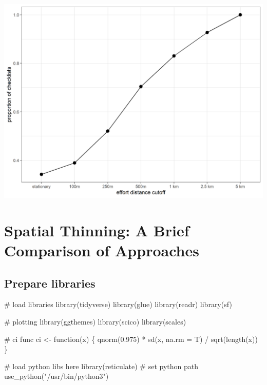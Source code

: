 \documentclass[]{article}
\newenvironment{Shaded}{}{}
\newcommand{\CommentTok}[1]{\textcolor[rgb]{0.00,0.50,0.00}{#1}}
\newcommand{\ControlFlowTok}[1]{\textcolor[rgb]{0.00,0.00,1.00}{#1}}
\newcommand{\DataTypeTok}[1]{#1}
\newcommand{\FloatTok}[1]{#1}
\newcommand{\KeywordTok}[1]{\textcolor[rgb]{0.00,0.00,1.00}{#1}}
\newcommand{\NormalTok}[1]{#1}
\newcommand{\OperatorTok}[1]{#1}
\newcommand{\StringTok}[1]{\textcolor[rgb]{0.00,0.50,0.50}{#1}}
\begin{document}
\includegraphics{figs/fig_cutoff_effort.png}

\hypertarget{spatial-thinning-a-brief-comparison-of-approaches}{%
\section{Spatial Thinning: A Brief Comparison of Approaches}\label{spatial-thinning-a-brief-comparison-of-approaches}}

\hypertarget{prepare-libraries-3}{%
\subsection{Prepare libraries}\label{prepare-libraries-3}}

\begin{Shaded}
\begin{Highlighting}[numbers=left,,]
\CommentTok{# load libraries}
\KeywordTok{library}\NormalTok{(tidyverse)}
\KeywordTok{library}\NormalTok{(glue)}
\KeywordTok{library}\NormalTok{(readr)}
\KeywordTok{library}\NormalTok{(sf)}

\CommentTok{# plotting}
\KeywordTok{library}\NormalTok{(ggthemes)}
\KeywordTok{library}\NormalTok{(scico)}
\KeywordTok{library}\NormalTok{(scales)}

\CommentTok{# ci func}
\NormalTok{ci <-}\StringTok{ }\ControlFlowTok{function}\NormalTok{(x) \{}
  \KeywordTok{qnorm}\NormalTok{(}\FloatTok{0.975}\NormalTok{) }\OperatorTok{*}\StringTok{ }\KeywordTok{sd}\NormalTok{(x, }\DataTypeTok{na.rm =}\NormalTok{ T) }\OperatorTok{/}\StringTok{ }\KeywordTok{sqrt}\NormalTok{(}\KeywordTok{length}\NormalTok{(x))}
\NormalTok{\}}

\CommentTok{# load python libs here}
\KeywordTok{library}\NormalTok{(reticulate)}
\CommentTok{# set python path}
\KeywordTok{use_python}\NormalTok{(}\StringTok{"/usr/bin/python3"}\NormalTok{)}
\end{Highlighting}
\end{Shaded}
\end{document}
